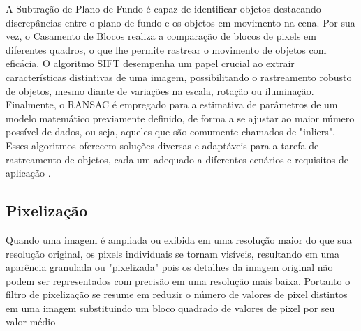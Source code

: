 A Subtração de Plano de Fundo é capaz de identificar objetos destacando discrepâncias entre o plano de fundo e os objetos em movimento na cena. Por sua vez, o Casamento de Blocos realiza a comparação de blocos de pixels em diferentes quadros, o que lhe permite rastrear o movimento de objetos com eficácia. O algoritmo \ac{SIFT} desempenha um papel crucial ao extrair características distintivas de uma imagem, possibilitando o rastreamento robusto de objetos, mesmo diante de variações na escala, rotação ou iluminação. Finalmente, o \ac{RANSAC} é empregado para a estimativa de parâmetros de um modelo matemático previamente definido, de forma a se ajustar ao maior número possível de dados, ou seja, aqueles que são comumente chamados de "inliers". Esses algoritmos oferecem soluções diversas e adaptáveis para a tarefa de rastreamento de objetos, cada um adequado a diferentes cenários e requisitos de aplicação \cite{tracking-algoritimo}.











\subsection[Pixelização]{Pixelização}

Quando uma imagem é ampliada ou exibida em uma resolução maior do que sua resolução original, os pixels individuais se tornam visíveis, resultando em uma aparência granulada ou "pixelizada" pois os detalhes da imagem original não podem ser representados com precisão em uma resolução mais baixa. Portanto o filtro de pixelização se resume em reduzir o número de valores de pixel distintos em uma imagem substituindo um bloco quadrado de valores de pixel por seu valor médio\cite{pixelizacao}




